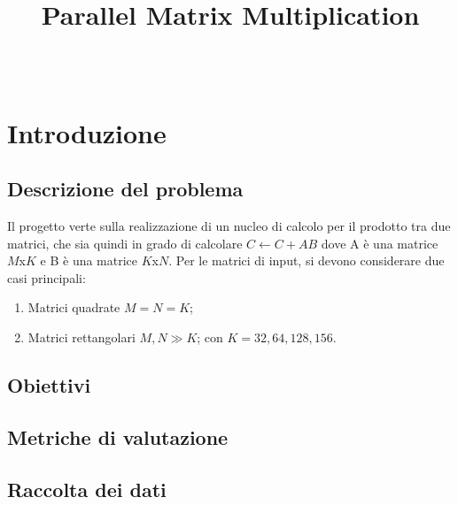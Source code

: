 \documentclass[conference]{IEEEtran}
\begin{document}
\title{Parallel Matrix Multiplication\\
}

\author{
\and
{}
\\
}


\maketitle

\begin{abstract}
\end{abstract}

\section{Introduzione}
\subsection{Descrizione del problema}
Il progetto verte sulla realizzazione di un nucleo di calcolo per il prodotto tra due matrici, che sia quindi in grado di calcolare
$C \leftarrow C + AB$
dove A è una matrice $M$x$K$ e B è una matrice $K$x$N$. Per le matrici di input, si devono considerare due casi principali:
\begin{enumerate}
    \item Matrici quadrate $M = N = K$;
    \item Matrici rettangolari $M, N \gg K$; con $K = 32, 64, 128, 156$.
\end{enumerate}

\subsection{Obiettivi}

\subsection{Metriche di valutazione}
\subsection{Raccolta dei dati}
\end{document}
